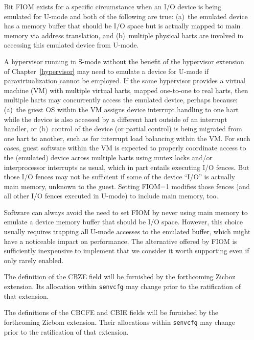 \begin{commentary}
Bit FIOM exists for a specific circumstance when an I/O device is
being emulated for U-mode and both of the following are true:
(a)~the emulated device has a memory buffer that should be I/O space
but is actually mapped to main memory via address translation, and
(b)~multiple physical harts are involved in accessing this emulated
device from U-mode.

A hypervisor running in S-mode without the benefit of the hypervisor
extension of Chapter~\ref{hypervisor} may need to emulate a device for
U-mode if paravirtualization cannot be employed.
If the same hypervisor provides a virtual machine (VM) with multiple
virtual harts, mapped one-to-one to real harts, then multiple harts may
concurrently access the emulated device, perhaps because:
(a)~the guest OS within the VM assigns device interrupt handling to one
hart while the device is also accessed by a different hart outside of
an interrupt handler, or
(b)~control of the device (or partial control) is being migrated
from one hart to another, such as for interrupt load balancing within
the VM.
For such cases, guest software within the VM is expected to properly
coordinate access to the (emulated) device across multiple harts using
mutex locks and/or interprocessor interrupts as usual, which in part
entails executing I/O fences.
But those I/O fences may not be sufficient if some of the device
``I/O'' is actually main memory, unknown to the guest.
Setting FIOM=1 modifies those fences (and all other I/O fences executed
in U-mode) to include main memory, too.

Software can always avoid the need to set FIOM by never using main
memory to emulate a device memory buffer that should be I/O space.
However, this choice usually requires trapping all U-mode accesses
to the emulated buffer, which might have a noticeable impact on
performance.
The alternative offered by FIOM is sufficiently inexpensive to implement that
we consider it worth supporting even if only rarely enabled.
\end{commentary}


The definition of the CBZE field will be furnished by the
forthcoming Zicboz extension.
Its allocation within {\tt senvcfg} may change prior to the ratification
of that extension.

The definitions of the CBCFE and CBIE fields will be furnished by the
forthcoming Zicbom extension.
Their allocations within {\tt senvcfg} may change prior to the ratification
of that extension.

